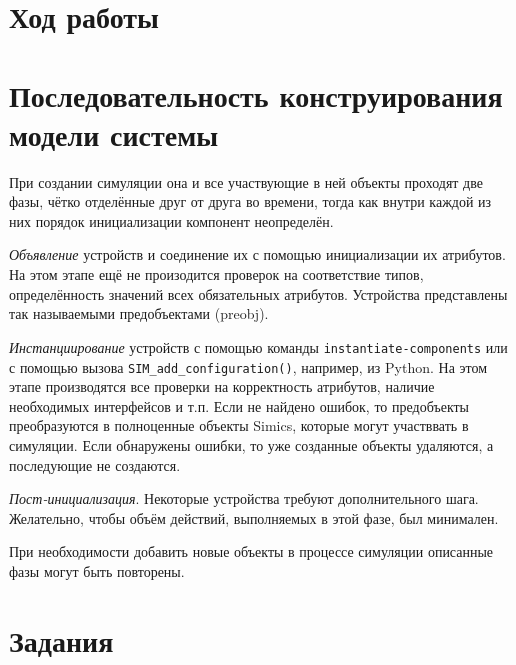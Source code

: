 \section{Ход работы}

\todo 


\section{Последовательность конструирования модели системы}

При создании симуляции она и все участвующие в ней объекты проходят две фазы, чётко отделённые друг от друга во времени, тогда как внутри каждой из них порядок инициализации компонент неопределён.

\begin{enumerate*}

\item \textit{Объявление} устройств и соединение их с помощью инициализации их атрибутов. На этом этапе ещё не произодится проверок на соответствие типов, определённость значений всех обязательных атрибутов. Устройства представлены так называемыми предобъектами (\abbr preobj).

\item \textit{Инстанциирование} устройств с помощью команды \texttt{instantiate-components} или с помощью вызова \texttt{SIM_add_configuration()}, например, из Python. На этом этапе производятся все проверки на корректность атрибутов, наличие необходимых интерфейсов и т.п. Если не найдено ошибок, то предобъекты преобразуются в полноценные объекты Simics, которые могут участввать в симуляции. Если обнаружены ошибки, то уже созданные объекты удаляются, а последующие не создаются.

\item \textit{Пост-инициализация}. Некоторые устройства требуют дополнительного шага. Желательно, чтобы объём действий, выполняемых в этой фазе, был минимален.

\end{enumerate*}

При необходимости добавить новые объекты в процессе симуляции описанные фазы могут быть повторены.

\section{Задания}

